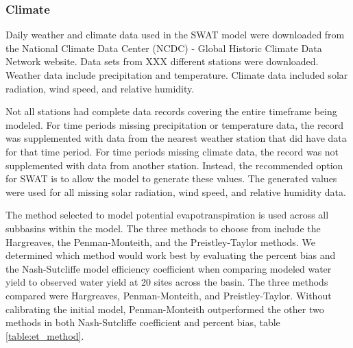 \subsubsection{Climate}	\label{sec:climate}


Daily weather and climate data used in the SWAT model were downloaded from the National Climate Data Center (NCDC) - Global Historic Climate Data Network website.  Data sets from XXX different stations were downloaded.  Weather data include precipitation and temperature.  Climate data included solar radiation, wind speed, and relative humidity.  

Not all stations had complete data records covering the entire timeframe being modeled.  For time periods missing precipitation or temperature data, the record was supplemented with data from the nearest weather station that did have data for that time period.  For time periods missing climate data, the record was not supplemented with data from another station.  Instead, the recommended option for SWAT is to allow the model to generate these values.  The generated values were used for all missing solar radiation, wind speed, and relative humidity data. 

The method selected to model potential evapotranspiration is used across all subbasins within the model.  The three methods to choose from include the Hargreaves, the Penman-Monteith, and the Preistley-Taylor methods.  We determined which method would work best by evaluating the percent bias and the Nash-Sutcliffe model efficiency coefficient  when comparing modeled water yield to observed water yield at 20 sites across the basin. The three methods compared were Hargreaves, Penman-Monteith, and Preistley-Taylor. Without calibrating the initial model, Penman-Monteith outperformed the other two methods in both Nash-Sutcliffe coefficient and percent bias, table \ref{table:et_method}.

